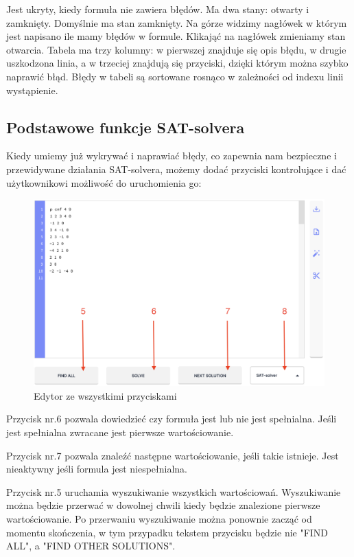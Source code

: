 \documentclass[a4paper,12pt,oneside]{book}
\theoremstyle{definition}
\begin{document}
\noindent Jest ukryty, kiedy formuła nie zawiera błędów. Ma dwa stany: otwarty i zamknięty. Domyślnie ma stan zamknięty. Na górze widzimy nagłówek w którym jest napisano ile mamy błędów w formule. Klikająć na nagłówek zmieniamy stan otwarcia. Tabela ma trzy kolumny: w pierwszej znajduje się opis błędu, w drugie uszkodzona linia, a w trzeciej znajdują się przyciski, dzięki którym można szybko naprawić błąd. Błędy w tabeli są sortowane rosnąco w zależności od indexu linii wystąpienie.

\subsection{Podstawowe funkcje SAT-solvera}

Kiedy umiemy już wykrywać i naprawiać błędy, co zapewnia nam bezpieczne i przewidywane działania SAT-solvera, możemy dodać przyciski kontrolujące i dać użytkownikowi możliwość do uruchomienia go:

\begin{figure}[ht]
    \centering
    \includegraphics[width=14.30cm]{7}
    \caption{Edytor ze wszystkimi przyciskami}
    \label{fig:7}
\end{figure}

Przycisk nr.6 pozwala dowiedzieć czy formuła jest lub nie jest spełnialna. Jeśli jest spełnialna zwracane jest pierwsze wartościowanie.

Przycisk nr.7 pozwala znaleźć następne wartościowanie, jeśli takie istnieje. Jest nieaktywny jeśli formula jest niespełnialna.

Przycisk nr.5 uruchamia wyszukiwanie wszystkich wartościowań. Wyszukiwanie można będzie przerwać w dowolnej chwili kiedy będzie znalezione pierwsze wartościowanie. Po przerwaniu wyszukiwanie można ponownie zacząć od momentu skończenia, w tym przypadku tekstem przycisku będzie nie "FIND ALL", a "FIND OTHER SOLUTIONS".
\end{document}
